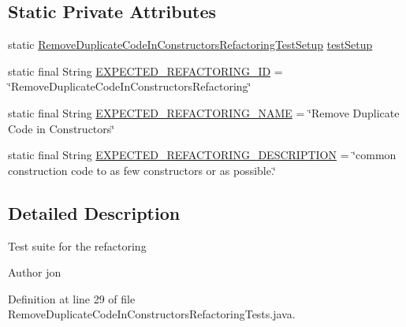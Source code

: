 \subsection*{Static Private Attributes}
\begin{DoxyCompactItemize}
\item 
static \hyperlink{classedu_1_1illinois_1_1canistelCassabanana_1_1tests_1_1RemoveDuplicateCodeInConstructorsRefactoringTestSetup}{RemoveDuplicateCodeInConstructorsRefactoringTestSetup} \hyperlink{classedu_1_1illinois_1_1canistelCassabanana_1_1tests_1_1RemoveDuplicateCodeInConstructorsRefactoringTests_a59cc4d65c71cfb08779284c46cb56d3e}{testSetup}
\item 
static final String \hyperlink{classedu_1_1illinois_1_1canistelCassabanana_1_1tests_1_1RemoveDuplicateCodeInConstructorsRefactoringTests_afaed708bee891f511d416153a09b2822}{EXPECTED\_\-REFACTORING\_\-ID} = \char`\"{}RemoveDuplicateCodeInConstructorsRefactoring\char`\"{}
\item 
static final String \hyperlink{classedu_1_1illinois_1_1canistelCassabanana_1_1tests_1_1RemoveDuplicateCodeInConstructorsRefactoringTests_a6731732fcf429dca7528f1b1e9327d96}{EXPECTED\_\-REFACTORING\_\-NAME} = \char`\"{}Remove Duplicate Code in Constructors\char`\"{}
\item 
static final String \hyperlink{classedu_1_1illinois_1_1canistelCassabanana_1_1tests_1_1RemoveDuplicateCodeInConstructorsRefactoringTests_a093baeba2e5e938d962b85eb72b91f41}{EXPECTED\_\-REFACTORING\_\-DESCRIPTION} = \char`\"{}common construction code to as few constructors or as possible.\char`\"{}
\end{DoxyCompactItemize}


\subsection{Detailed Description}
Test suite for the refactoring

\begin{DoxyAuthor}{Author}
jon 
\end{DoxyAuthor}


Definition at line 29 of file RemoveDuplicateCodeInConstructorsRefactoringTests.java.



